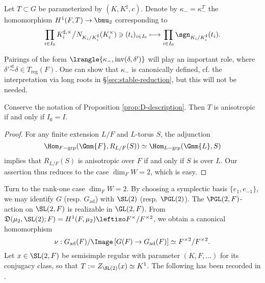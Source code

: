 \documentclass[a4paper,10pt]{article}
\begin{document}
\begin{definition}\label{def:kappa-minus}\index{$\kappa_-$}
	Let $T \subset G$ be parameterized by $(K, K^\sharp, c)$. Denote by $\kappa_- = \kappa_-^T$ the homomorphism $H^1(F,T) \to \bmu_2$ corresponding to
	\[ \prod_{i \in I_0} K_i^{\sharp, \times} \big/ N_{K_i/K_i^\sharp}(K_i^\times) \ni (t_i)_{i \in I_0} \longmapsto \prod_{i \in I_0} \sgn_{K_i/K_i^\sharp}(t_i). \]
\end{definition}
Pairings of the form $\lrangle{ \kappa_-, \text{inv}(\delta, \delta')}$ will play an important role, where $\delta' \stackrel{\text{st}}{\sim} \delta \in T_\text{reg}(F)$. One can show that $\kappa_-$ is canonically defined, cf. the interpretation via long roots in \S\ref{sec:stable-reduction}, but this will not be needed.

\begin{lemma}\label{prop:parameter-ani}
	Conserve the notation of Proposition \ref{prop:D-description}. Then $T$ is anisotropic if and only if $I_0 = I$.
\end{lemma}
\begin{proof}
	For any finite extension $L/F$ and $L$-torus $S$, the adjunction
	\[ \Hom_{F-\text{grp}}(\Gmm{F}, R_{L/F}(S)) \simeq \Hom_{L-\text{grp}}(\Gmm{L}, S) \]
	implies that $R_{L/F}(S)$ is anisotropic over $F$ if and only if $S$ is over $L$. Our assertion thus reduces to the case $\dim_F W = 2$, which is easy.
\end{proof}

Turn to the rank-one case $\dim_F W = 2$. By choosing a symplectic basis $\{e_1, e_{-1}\}$, we may identify $G$ (resp. $G_\text{ad}$) with $\SL(2)$ (resp. $\PGL(2)$). The $\PGL(2,F)$-action on $\SL(2,F)$ is realizable in $\GL(2,F)$. From $\mathfrak{D}(\mu_2, \SL(2); F) = H^1(F, \mu_2) \leftiso F^\times/F^{\times 2}$, we obtain a canonical homomorphism
\begin{equation}\label{eqn:nu-arises}
	\nu: G_\text{ad}(F)/\Image\left[ G(F) \to G_\text{ad}(F) \right] \simeq F^{\times 2}/F^{\times 2}.
\end{equation}
Let $x \in \SL(2, F)$ be semisimple regular with parameter $(K, F, \ldots)$ for its conjugacy class, so that $T := Z_{\SL(2)}(x) \simeq K^1$. The following has been recorded in \cite[p.728]{LL79}.
\end{document}

